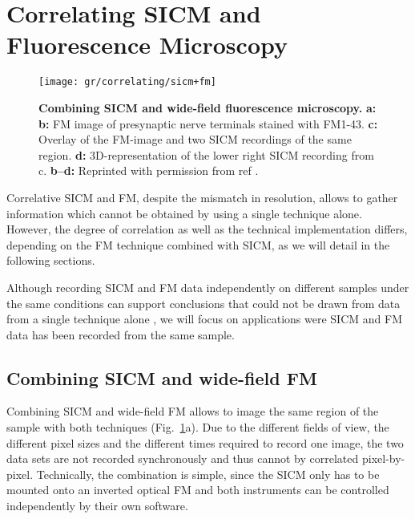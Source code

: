 \section{Correlating SICM and Fluorescence Microscopy}
\label{sec:correlating-sicm-and-fm}

\begin{figure}
  \texttt{[image: gr/correlating/sicm+fm]}
  \caption{%
    \textbf{Combining SICM and wide-field fluorescence microscopy.}
    \textbf{a:}
    \textbf{b:} FM image of presynaptic nerve terminals stained with
    FM1-43. \textbf{c:} Overlay of the FM-image and two SICM recordings of the
    same region. \textbf{d:} 3D-representation of the lower right SICM
    recording from c.
    \textbf{b--d:} Reprinted with permission from ref \cite{Scheenen2015}.
  }
  \label{fig:sicm+fm}
\end{figure}

Correlative SICM and FM, despite the mismatch in resolution, allows to gather
information which cannot be obtained by using a single technique
alone. However, the degree of correlation as well as the technical
implementation differs, depending on the FM technique combined with SICM, as
we will detail in the following sections.

Although recording SICM and FM data independently on different samples under
the same conditions can support conclusions that could not be drawn from data
from a single technique alone \cite{Gesper2017,Lee2013,Lyon2009}, we will
focus on applications were SICM and FM data has been recorded from the same
sample.


\subsection{Combining SICM and wide-field FM}
\label{sec:SICM+widefield}
Combining SICM and wide-field FM allows to image the same region of the sample
with both techniques (Fig.~\ref{fig:sicm+fm}a). Due to the different fields of
view, the different pixel sizes and the different times required to record one
image, the two data sets are not recorded synchronously and thus cannot by
correlated pixel-by-pixel. Technically, the combination is simple, since
the SICM only has to be mounted onto an inverted optical FM and both
instruments can be controlled independently by their own software.

